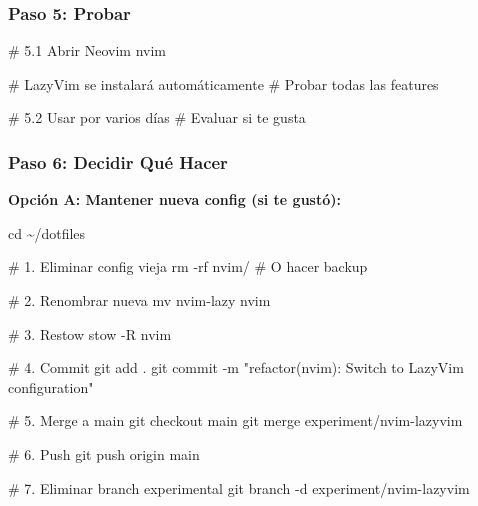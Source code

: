 \documentclass[
  doc,
  floatsintext,
  longtable,
  a4paper,
  nolmodern,
  notxfonts,
  notimes,
  12pt,
  colorlinks=true,linkcolor=blue,citecolor=blue,urlcolor=blue]{apa7}
\newenvironment{Shaded}{\begin{snugshade}}{\end{snugshade}}
\newcommand{\AttributeTok}[1]{\textcolor[rgb]{0.40,0.45,0.13}{#1}}
\newcommand{\BuiltInTok}[1]{\textcolor[rgb]{0.00,0.23,0.31}{#1}}
\newcommand{\CommentTok}[1]{\textcolor[rgb]{0.37,0.37,0.37}{#1}}
\newcommand{\ExtensionTok}[1]{\textcolor[rgb]{0.00,0.23,0.31}{#1}}
\newcommand{\FunctionTok}[1]{\textcolor[rgb]{0.28,0.35,0.67}{#1}}
\newcommand{\NormalTok}[1]{\textcolor[rgb]{0.00,0.23,0.31}{#1}}
\newcommand{\StringTok}[1]{\textcolor[rgb]{0.13,0.47,0.30}{#1}}
\begin{document}
\subsubsection{Paso 5: Probar}\label{paso-5-probar}

\begin{Shaded}
\begin{Highlighting}[]
\CommentTok{\# 5.1 Abrir Neovim}
\ExtensionTok{nvim}

\CommentTok{\# LazyVim se instalará automáticamente}
\CommentTok{\# Probar todas las features}

\CommentTok{\# 5.2 Usar por varios días}
\CommentTok{\# Evaluar si te gusta}
\end{Highlighting}
\end{Shaded}

\subsubsection{Paso 6: Decidir Qué
Hacer}\label{paso-6-decidir-quuxe9-hacer}

\textbf{Opción A: Mantener nueva config (si te gustó):}

\begin{Shaded}
\begin{Highlighting}[]
\BuiltInTok{cd}\NormalTok{ \textasciitilde{}/dotfiles}

\CommentTok{\# 1. Eliminar config vieja}
\FunctionTok{rm} \AttributeTok{{-}rf}\NormalTok{ nvim/  }\CommentTok{\# O hacer backup}

\CommentTok{\# 2. Renombrar nueva}
\FunctionTok{mv}\NormalTok{ nvim{-}lazy nvim}

\CommentTok{\# 3. Restow}
\ExtensionTok{stow} \AttributeTok{{-}R}\NormalTok{ nvim}

\CommentTok{\# 4. Commit}
\FunctionTok{git}\NormalTok{ add .}
\FunctionTok{git}\NormalTok{ commit }\AttributeTok{{-}m} \StringTok{"refactor(nvim): Switch to LazyVim configuration"}

\CommentTok{\# 5. Merge a main}
\FunctionTok{git}\NormalTok{ checkout main}
\FunctionTok{git}\NormalTok{ merge experiment/nvim{-}lazyvim}

\CommentTok{\# 6. Push}
\FunctionTok{git}\NormalTok{ push origin main}

\CommentTok{\# 7. Eliminar branch experimental}
\FunctionTok{git}\NormalTok{ branch }\AttributeTok{{-}d}\NormalTok{ experiment/nvim{-}lazyvim}
\end{Highlighting}
\end{Shaded}
\end{document}
